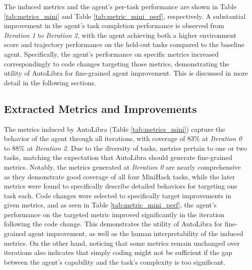 

\begin{flushleft}

The induced metrics and the agent's per-task performance are shown in Table \ref{tab:metrics_mini} and Table \ref{tab:metric_mini_perf}, respectively. A substantial improvement in the agent's task completion performance is observed from \emph{Iteration 1} to \emph{Iteration 2}, with the agent achieving both a higher environment score and trajectory performance on the held-out tasks compared to the baseline agent. Specifically, the agent's performance on specific metrics increased correspondingly to code changes targeting those metrics, demonstrating the utility of AutoLibra for fine-grained agent improvement. This is discussed in more detail in the following sections.

\subsection{Extracted Metrics and Improvements}
The metrics induced by AutoLibra (Table \ref{tab:metrics_mini}) capture the behavior of the agent through all iterations, with coverage of 83\% at \emph{Iteration 0} to 88\% at \emph{Iteration 2}. Due to the diversity of tasks, metrics pertain to one or two tasks, matching the expectation that AutoLibra should generate fine-grained metrics. Notably, the metrics generated at \emph{Iteration 0} are nearly comprehensive as they demonstrate good coverage of all four MiniHack tasks, while the later metrics were found to specifically describe detailed behaviors for targeting one task each. Code changes were selected to specifically target improvements in given metrics, and as seen in Table \ref{tab:metric_mini_perf}, the agent's performance on the targeted metric improved significantly in the iteration following the code change. This demonstrates the utility of AutoLibra for fine-grained agent improvement, as well as the human interpretability of the induced metrics. On the other hand, noticing that some metrics remain unchanged over iterations also indicates that simply coding might not be sufficient if the gap between the agent's capability and the task's complexity is too significant.


\end{flushleft}
